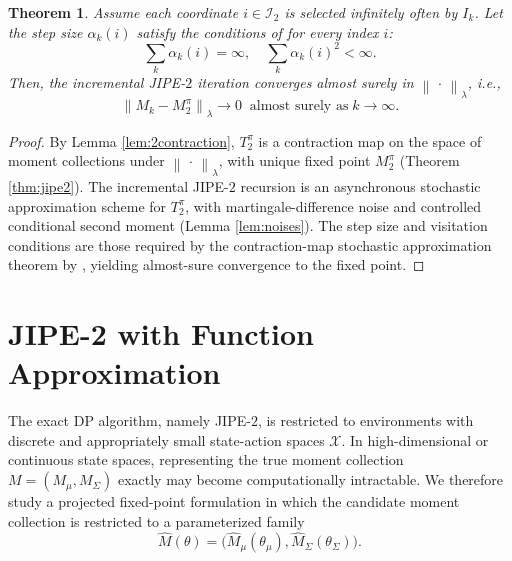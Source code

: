 \documentclass[accepted]{uai2026}
\theoremstyle{plain}
\newtheorem{theorem}{Theorem}[section]
\theoremstyle{definition}
\theoremstyle{remark}
\newcommand{\LVert}{\left\lVert}
\newcommand{\RVert}{\right\rVert}
\newcommand{\1}{\mathbbm{1}}
\newcommand{\norm}[1]{\left\lVert #1\right\rVert}
\begin{document}
\begin{theorem}
Assume each coordinate $i \in \mathcal{I}_2$ is selected infinitely often by $I_k$. Let the step size $\alpha_k(i)$ satisfy the conditions of \citet{robbins1951stochastic} for every index $i$:
\begin{equation}
\sum_k \alpha_k(i) = \infty,\quad \sum_k\alpha_k(i)^2 < \infty.
\end{equation} 
Then, the incremental JIPE-$2$ iteration converges almost surely in $\norm{\,\cdot\,}_\lambda$, i.e.,
\begin{equation}
\LVert M_k - M^\pi_2 \RVert_\lambda \to 0 \;\;\text{almost surely as} \; k \to \infty.
\end{equation}
\end{theorem}
\begin{proof}
By Lemma \ref{lem:2contraction}, $T^\pi_2$ is a contraction map on the space of moment collections under $\norm{\,\cdot\,}_\lambda$, with unique fixed point $M^\pi_2$ (Theorem \ref{thm:jipe2}). The incremental JIPE-$2$ recursion is an asynchronous stochastic approximation scheme \citep{jaakkola1993convergence, tsitsiklis1994asynchronous, bertsekas1995neuro} for $T^\pi_2$, with martingale-difference noise and controlled conditional second moment (Lemma \ref{lem:noises}). The step size and visitation conditions are those required by the contraction-map stochastic approximation theorem by \citet{DRL-textbook}, yielding almost-sure convergence to the fixed point.
\end{proof}

\newpage
\section{JIPE-2 with Function Approximation}\label{app:funcapprox}
The exact DP algorithm, namely JIPE-$2$, is restricted to environments with discrete and appropriately small state-action spaces $\mathcal{X}$. In high-dimensional or continuous state spaces, representing the true moment collection $M=(M_\mu,M_\Sigma)$ exactly may become computationally intractable. We therefore study a projected fixed-point formulation in which the candidate moment collection is restricted to a parameterized family
\begin{equation}
\hat{M}(\theta) = \big(\hat{M}_\mu(\theta_\mu),\hat{M}_\Sigma(\theta_\Sigma)\big).
\end{equation}
\end{document}
